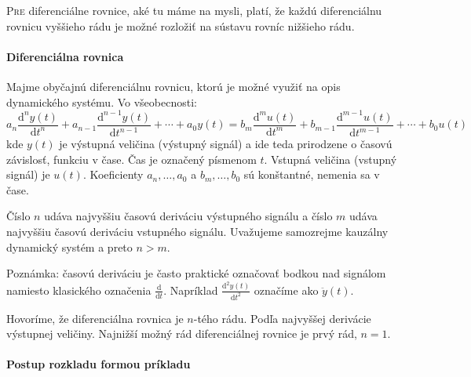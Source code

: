 \documentclass[a4paper, 10pt, ]{article}
\begin{document}
\bigskip

\normalsize
\normalfont










\noindent
\lettrine[lines=1, nindent=1pt, loversize=0.0]{P}{re} 
diferenciálne rovnice, aké tu máme na mysli, platí, že každú diferenciálnu rovnicu vyššieho rádu je možné rozložiť na sústavu rovníc nižšieho rádu.



\paragraph{Diferenciálna rovnica}

Majme obyčajnú diferenciálnu rovnicu, ktorú je možné využiť na opis dynamického systému. Vo všeobecnosti:
\begin{equation}
    a_n \frac{\text{d}^n y(t)}{\text{d}t^n} 
    + a_{n-1} \frac{\text{d}^{n-1} y(t)}{\text{d}t^{n-1}}
    +
    \cdots
    +
    a_0 y(t)
    =
    b_m \frac{\text{d}^m u(t)}{\text{d}t^m} 
    + b_{m-1} \frac{\text{d}^{m-1} u(t)}{\text{d}t^{m-1}}
    +
    \cdots
    +
    b_0 u(t)
\end{equation}
kde $y(t)$ je výstupná veličina (výstupný signál) a ide teda prirodzene o časovú závislosť, funkciu v čase. Čas je označený písmenom $t$. Vstupná veličina (vstupný signál) je $u(t)$. Koeficienty $a_n, \ldots, a_0$ a $b_m, \ldots, b_0$ sú konštantné, nemenia sa v čase.

Číslo $n$ udáva najvyššiu časovú deriváciu výstupného signálu a číslo $m$ udáva najvyššiu časovú deriváciu vstupného signálu. Uvažujeme samozrejme kauzálny dynamický systém a preto $n>m$.

Poznámka: časovú deriváciu je často praktické označovať bodkou nad signálom namiesto klasického označenia $\frac{\text{d}}{\text{d}t}$. Napríklad $\frac{\text{d}^2 y(t)}{\text{d}t^2}$ označíme ako $\ddot y(t)$.

Hovoríme, že diferenciálna rovnica je $n$-tého rádu. Podľa najvyššej derivácie výstupnej veličiny. Najnižší možný rád diferenciálnej rovnice je prvý rád, $n=1$.



\paragraph{Postup rozkladu formou príkladu}
\end{document}
